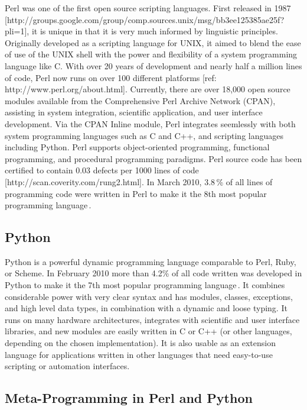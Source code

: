\documentclass[12pt]{article}
\begin{document}
Perl was one of the first open source scripting languages. First
released in 1987
[http://groups.google.com/group/comp.sources.unix/msg/bb3ee125385ae25f?pli=1],
it is unique in that it is very much informed by linguistic
principles.  Originally developed as a scripting language for UNIX, it
aimed to blend the ease of use of the UNIX shell with the power and
flexibility of a system programming language like C.  With over 20
years of development and nearly half a million lines of code, Perl now
runs on over 100 different platforms [ref:
http://www.perl.org/about.html].  Currently, there are over 18,000
open source modules available from the Comprehensive Perl Archive
Network (CPAN), assisting in system integration, scientific
application, and user interface development.  Via the CPAN Inline
module, Perl integrates seemlessly with both system programming
languages such as C and C++, and scripting languages including Python.
Perl supports object-oriented programming, functional programming, and
procedural programming paradigms.  Perl source code has been certified
to contain 0.03 defects per 1000 lines of code
[http://scan.coverity.com/rung2.html].  In March 2010,
3.8\,\% of all lines of programming code were written in Perl to make
it the 8th most popular programming
language\,\cite{software09:_tiobe_progr_commun_index}.

\subsection{Python}

Python is a powerful dynamic programming language comparable to Perl,
Ruby, or Scheme.  In February 2010 more than 4.2\% of all code written was
developed in Python to make it the 7th most popular programming
language\,\cite{software09:_tiobe_progr_commun_index}. It combines
considerable power with very clear syntax and has modules, classes,
exceptions, and high level data types, in combination with a dynamic
and loose typing. It runs on many hardware architectures, integrates
with scientific and user interface libraries, and new modules are
easily written in C or C++ (or other languages, depending on the
chosen implementation). It is also usable as an extension language for
applications written in other languages that need easy-to-use
scripting or automation interfaces.


\subsection{Meta-Programming in Perl and Python}
\end{document}

